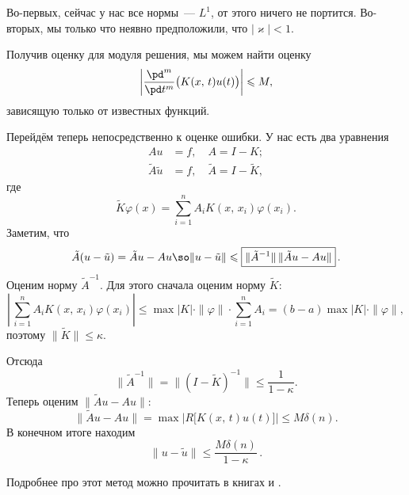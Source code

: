 \documentclass{trlnotes}
\begin{document}
    \begin{rem}
        Во-первых, сейчас у нас все нормы~--- $L^1$, от этого ничего не портится. Во-вторых, мы только что неявно предположили, что $|\varkappa| < 1$.
    \end{rem}

    Получив оценку для модуля решения, мы можем найти оценку
    \[
        \left|\dfrac{\pd^{m}}{\pd t^m} \big(K(x, \, t) u(t)\big)\right| \leqslant M,
    \]
    зависящую только от известных функций.

    Перейдём теперь непосредственно к оценке ошибки. У нас есть два уравнения 
    \begin{align*}
        Au &= f, \quad A = I - K; \\
        \tilde{A} \tilde{u} &= f, \quad \tilde{A} = I - \tilde{K},
    \end{align*}
    где 
    \[
        \tilde{K}\varphi(x) = \sum\limits_{i = 1}^n A_i K(x, \, x_i) \varphi(x_i).
    \]
    Заметим, что
    \[
        \tilde{A}(u - \tilde{u}) = \tilde{A}u - Au \so \|u - \tilde{u}\| \leqslant \boxed{\|\tilde{A}^{-1}\| \, \|\tilde{A}u - Au\|}\,.
    \]
    Оценим норму $\tilde{A}^{-1}$. Для этого сначала оценим норму $\tilde{K}$:
    \[
        \left | \, \sum\limits_{i = 1}^n A_i K(x, \, x_i) \varphi(x_i) \right | \leqslant \max |K| \cdot \|\varphi\| \cdot \sum\limits_{i = 1}^n A_i = (b - a) \max |K| \cdot \|\varphi\|,
    \]
    поэтому $\|\tilde{K}\| \leqslant \kappa$.

    Отсюда
    \[
        \|\tilde{A}^{-1}\| = \big\|(I - \tilde{K})^{-1}\big\| \leqslant \dfrac{1}{1 - \kappa}.
    \]
    Теперь оценим $\|\tilde{A}u - Au\|$:
    \[
        \|\tilde{A}u - Au\| = \max \big|R\big[K(x, \, t) u(t)\big]\big| \leqslant M\delta(n).
    \]
    В конечном итоге находим
    \[
        \boxed{\|u - \tilde{u}\| \leqslant \dfrac{M\delta(n)}{1 - \kappa}}\,.
    \]

    Подробнее про этот метод можно прочитать в книгах \cite{gavurin} и \cite{comp-krilov-2}.
\end{document}
